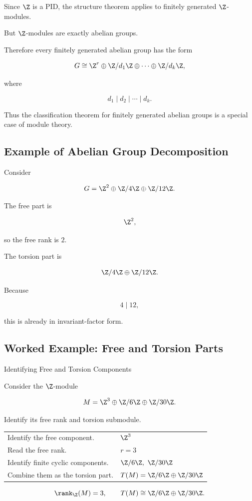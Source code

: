 Since \(\Z\) is a PID, the structure theorem applies to finitely generated
\(\Z\)-modules.

But \(\Z\)-modules are exactly abelian groups.

Therefore every finitely generated abelian group has the form

\[ G\cong\Z^r\oplus\Z/d_1\Z\oplus\cdots\oplus\Z/d_k\Z, \]

where

\[ d_1\mid d_2\mid\cdots\mid d_k. \]

Thus the classification theorem for finitely generated abelian groups is a
special case of module theory.

\subsection{Example of Abelian Group Decomposition}
\label{subsec:abelian-group-decomposition-example}

Consider

\[ G=\Z^2\oplus\Z/4\Z\oplus\Z/12\Z. \]

The free part is

\[ \Z^2, \]

so the free rank is \(2\).

The torsion part is

\[ \Z/4\Z\oplus\Z/12\Z. \]

Because

\[ 4\mid12, \]

this is already in invariant-factor form.

\subsection{Worked Example: Free and Torsion Parts}
\label{subsec:worked-free-torsion-parts}

\begin{workedexamplebox}{Identifying Free and Torsion Components}

Consider the \(\Z\)-module

\[ M=\Z^3\oplus\Z/6\Z\oplus\Z/30\Z. \]

Identify its free rank and torsion submodule.

\begin{tabularx}{\textwidth}{@{}>{\raggedright\arraybackslash}p{}X@{}}
Identify the free component. & \(\Z^3\)\\
Read the free rank. & \(r=3\)\\
Identify finite cyclic components. & \(\Z/6\Z,\ \Z/30\Z\)\\
Combine them as the torsion part. & \(T(M)=\Z/6\Z\oplus\Z/30\Z\)
\end{tabularx}

\begin{answerbox}
\[ \rank_{\Z}(M)=3,\qquad T(M)\cong\Z/6\Z\oplus\Z/30\Z. \]
\end{answerbox}
\end{workedexamplebox}

